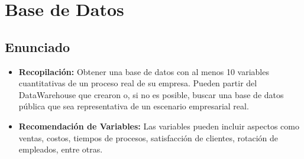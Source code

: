 \newpage
\section{Base de Datos}
\subsection{Enunciado}
\begin{itemize}
    \item \textbf{Recopilación:} Obtener una base de datos con al menos 10 variables cuantitativas de un proceso real de su empresa. Pueden partir del DataWarehouse que crearon o, si no es posible, buscar una base de datos pública que sea representativa de un escenario empresarial real.
    \item \textbf{Recomendación de Variables:} Las variables pueden incluir aspectos como ventas, costos, tiempos de procesos, satisfacción de clientes, rotación de empleados, entre otras.
\end{itemize}